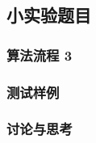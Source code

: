 \begin{comment}
    每个模块已经预留了图片模块，如想使用，须使用如下命名方式  
    callback-[lab no]
    test-[lab no]-[pic no], 其中[pic no]用于同节多个图片
\end{comment}

\renewcommand{\labno}{3} %

\subsection{小实验题目}


\subsubsection{算法流程 \labno}

\begin{comment}
\begin{figure}[H]
  \centering
  \texttt{[image: pic/callback-\\detokenize\\expandafter\{\\labno]}.png} 
  \caption{callback for lab \labno}
\end{figure}
\end{comment}




\subsubsection{测试样例}

\begin{comment}
\begin{figure}[H]
  \centering
  \texttt{[image: pic/test-\\detokenize\\expandafter\{\\labno]}.png} 
  \caption{test for lab \labno}
\end{figure}
\end{comment}


\subsubsection{讨论与思考}

